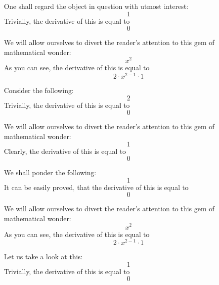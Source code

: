 \documentclass{article}
\begin{document}
One shall regard the object in question with utmost interest:
\begin{equation}
1 
\end{equation}
Trivially, the derivative of this is equal to
\begin{equation}
0 
\end{equation}

We will allow ourselves to divert the reader's attention to this gem of mathematical wonder:
\begin{equation}
x ^{2 } 
\end{equation}
As you can see, the derivative of this is equal to
\begin{equation}
2 \cdot x ^{2 - 1 } \cdot 1 
\end{equation}

Consider the following:
\begin{equation}
2 
\end{equation}
Trivially, the derivative of this is equal to
\begin{equation}
0 
\end{equation}

We will allow ourselves to divert the reader's attention to this gem of mathematical wonder:
\begin{equation}
1 
\end{equation}
Clearly, the derivative of this is equal to
\begin{equation}
0 
\end{equation}

We shall ponder the following:
\begin{equation}
1 
\end{equation}
It can be easily proved, that the derivative of this is equal to
\begin{equation}
0 
\end{equation}

We will allow ourselves to divert the reader's attention to this gem of mathematical wonder:
\begin{equation}
x ^{2 } 
\end{equation}
As you can see, the derivative of this is equal to
\begin{equation}
2 \cdot x ^{2 - 1 } \cdot 1 
\end{equation}

Let us take a look at this:
\begin{equation}
1 
\end{equation}
Trivially, the derivative of this is equal to
\begin{equation}
0 
\end{equation}
\end{document}
